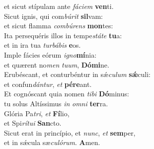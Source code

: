 \evenverse et sicut stípulam ante \textit{fá}\textit{ci}\textit{em} \textbf{ven}ti.\\
\oddverse Sicut ignis, qui com\textit{bú}\textit{rit} \textbf{sil}vam:~\*\\
\oddverse et sicut flamma \textit{com}\textit{bú}\textit{rens} \textbf{mon}tes:\\
\evenverse Ita persequéris illos in tempe\textit{stá}\textit{te} \textbf{tu}a:~\*\\
\evenverse et in ira tua \textit{tur}\textit{bá}\textit{bis} \textbf{e}os.\\
\oddverse Imple fácies eórum \textit{i}\textit{gno}\textbf{mí}nia:~\*\\
\oddverse et quærent no\textit{men} \textit{tu}\textit{um}, \textbf{Dó}\textbf{mi}ne.\\
\evenverse Erubéscant, et conturbéntur in sǽ\textit{cu}\textit{lum} \textbf{sǽ}culi:~\*\\
\evenverse et confun\textit{dán}\textit{tur}, \textit{et} \textbf{pé}\textbf{re}ant.\\
\oddverse Et cognóscant quia nomen \textit{ti}\textit{bi} \textbf{Dó}minus:~\*\\
\oddverse tu solus Altíssimus \textit{in} \textit{om}\textit{ni} \textbf{ter}ra.\\
\evenverse Glória Pa\textit{tri}, \textit{et} \textbf{Fí}lio,~\*\\
\evenverse et Spi\textit{rí}\textit{tu}\textit{i} \textbf{San}cto.\\
\oddverse Sicut erat in princípio, et \textit{nunc}, \textit{et} \textbf{sem}per,~\*\\
\oddverse et in sǽcula sæ\textit{cu}\textit{ló}\textit{rum}. \textbf{A}men.\\
